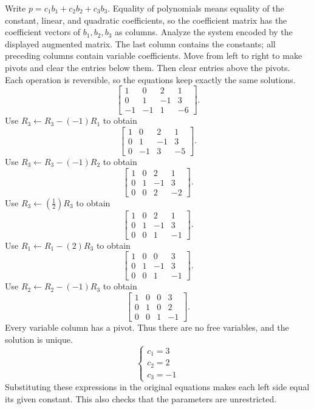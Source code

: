 Write $p=c_1b_1+c_2b_2+c_3b_3$. Equality of polynomials means equality of the constant, linear, and quadratic coefficients, so the coefficient matrix has the coefficient vectors of $b_1,b_2,b_3$ as columns.
\goal Analyze the system encoded by the displayed augmented matrix. The last column contains the constants; all preceding columns contain variable coefficients.
\idea Move from left to right to make pivots and clear the entries below them. Then clear entries above the pivots. Each operation is reversible, so the equations keep exactly the same solutions.
\[ \left[\begin{array}{rrr|r}1&0&2&1\\0&1&-1&3\\-1&-1&1&-6\end{array}\right].\]
Use $R_{3}\leftarrow R_{3}-(-1)R_{1}$ to obtain
\[ \left[\begin{array}{rrr|r}1&0&2&1\\0&1&-1&3\\0&-1&3&-5\end{array}\right].\]
Use $R_{3}\leftarrow R_{3}-(-1)R_{2}$ to obtain
\[ \left[\begin{array}{rrr|r}1&0&2&1\\0&1&-1&3\\0&0&2&-2\end{array}\right].\]
Use $R_{3}\leftarrow(\frac{1}{2})R_{3}$ to obtain
\[ \left[\begin{array}{rrr|r}1&0&2&1\\0&1&-1&3\\0&0&1&-1\end{array}\right].\]
Use $R_{1}\leftarrow R_{1}-(2)R_{3}$ to obtain
\[ \left[\begin{array}{rrr|r}1&0&0&3\\0&1&-1&3\\0&0&1&-1\end{array}\right].\]
Use $R_{2}\leftarrow R_{2}-(-1)R_{3}$ to obtain
\[ \left[\begin{array}{rrr|r}1&0&0&3\\0&1&0&2\\0&0&1&-1\end{array}\right].\]
Every variable column has a pivot. Thus there are no free variables, and the solution is unique.
\[ \begin{cases}c_{1}=3\\c_{2}=2\\c_{3}=-1\end{cases}\]
Substituting these expressions in the original equations makes each left side equal its given constant. This also checks that the parameters are unrestricted.

